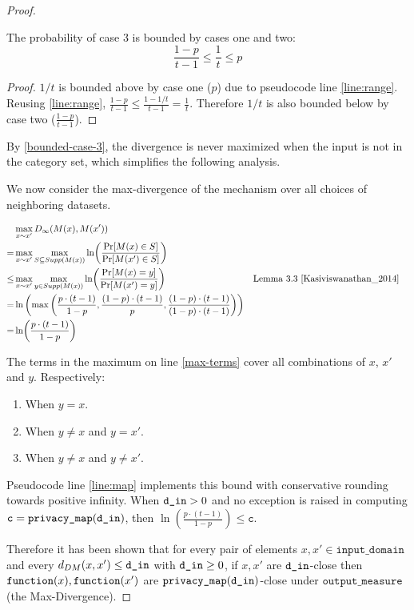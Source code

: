 \documentclass{article}
\begin{document}
\begin{proof}
\begin{tcolorbox}
\begin{lemma}
    \label{bounded-case-3}
    The probability of case 3 is bounded by cases one and two:
     \begin{equation}
        \frac{1 - p}{t - 1} \leq \frac{1}{t} \leq p
     \end{equation}
\end{lemma}

\begin{proof}
$1 / t$ is bounded above by case one ($p$) due to pseudocode line \ref{line:range}.
Reusing \ref{line:range}, $\frac{1 - p}{t - 1} \leq \frac{1 - 1/t}{t - 1} = \frac{1}{t}$.
Therefore $1 / t$ is also bounded below by case two ($\frac{1 - p}{t - 1}$).
\end{proof}
\end{tcolorbox}

By \ref{bounded-case-3}, the divergence is never maximized when the input is not in the category set,
which simplifies the following analysis.

We now consider the max-divergence of the mechanism over all choices of neighboring datasets.

\begin{align}
    &\max_{x \sim x'} D_{\infty}(M(x), M(x')) \\
    =& \max_{x \sim x'} \max_{S \subseteq Supp(M(x))}\ln (\frac{\Pr[M(x) \in S]}{\Pr[M(x') \in S]}) \\
    \le& \max_{x \sim x'} \max_{y \in Supp(M(x))}\ln (\frac{\Pr[M(x) = y]}{\Pr[M(x') = y]}) &&\text{Lemma 3.3 } \cite{Kasiviswanathan_2014} \\
    =& \ln \left(\max\left(\frac{p \cdot (t - 1)}{1 - p}, \frac{(1 - p) \cdot (t - 1)}{p}, \frac{(1 - p) \cdot (t - 1)}{(1 - p) \cdot (t - 1)}\right)\right) \label{max-terms} \\
    =& \ln (\frac{p \cdot (t - 1)}{1 - p})
\end{align}

The terms in the maximum on line \ref{max-terms} cover all combinations of $x$, $x'$ and $y$. Respectively:
\begin{enumerate}
    \item When $y = x$.
    \item When $y \ne x$ and $y = x'$.
    \item When $y \ne x$ and $y \ne x'$.
\end{enumerate}

Pseudocode line \ref{line:map} implements this bound with conservative rounding towards positive infinity.
When $\texttt{d\_in} > 0$ and no exception is raised in computing $\texttt{c} = \texttt{privacy\_map}(\texttt{d\_in})$, then $\ln\left(\frac{p \cdot (t - 1)}{1 - p}\right) \leq \texttt{c}$.

Therefore it has been shown that for every pair of elements $x, x' \in \texttt{input\_domain}$ and every $d_{DM}(x, x') \le \texttt{d\_in}$ with $\texttt{d\_in} \ge 0$,
if $x, x'$ are $\texttt{d\_in}$-close then $\texttt{function}(x),\texttt{function}(x')$ are $\texttt{privacy\_map}(\texttt{d\_in})$-close under $\texttt{output\_measure}$ (the Max-Divergence).
\end{proof}



\end{document}
